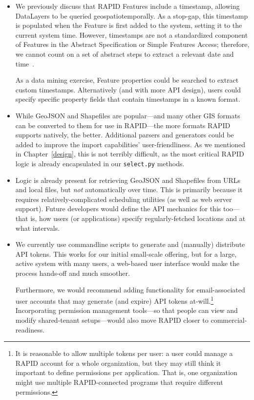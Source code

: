 \begin{itemize}

    \item We previously discuss that RAPID Features include a timestamp, allowing DataLayers to be queried geospatiotemporally. As a stop-gap, this timestamp is populated when the Feature is first added to the system, setting it to the current system time. However, timestamps are not a standardized component of Features in the Abstract Specification or Simple Features Access; therefore, we cannot count on a set of abstract steps to extract a relevant date and time~\cite{SFA}.
    
    As a data mining exercise, Feature properties could be searched to extract custom timestamps. Alternatively (and with more API design), users could specify specific property fields that contain timestamps in a known format.
    
    \item While GeoJSON and Shapefiles are popular---and many other GIS formats can be converted to them for use in RAPID---the more formats RAPID supports natively, the better. Additional parsers and generators could be added to improve the import capabilities' user-friendliness. As we mentioned in Chapter~\ref{design}, this is not terribly difficult, as the most critical RAPID logic is already encapsulated in our \texttt{select.py} methods.
    
    \item Logic is already present for retrieving GeoJSON and Shapefiles from URLs and local files, but \textit{not} automatically over time. This is primarily because it requires relatively-complicated scheduling utilities (as well as web server support). Future developers would define the API mechanics for this too---that is, how users (or applications) specify regularly-fetched locations and at what intervals.
    
    \item We currently use commandline scripts to generate and (manually) distribute API tokens. This works for our initial small-scale offering, but for a large, active system with many users, a web-based user interface would make the process hands-off and much smoother.
    
    Furthermore, we would recommend adding functionality for email-associated user accounts that may generate (and expire) API tokens at-will.\footnote{It is reasonable to allow multiple tokens per user: a user could manage a RAPID account for a whole organization, but they may still think it important to define permissions per application. That is, one organization might use multiple RAPID-connected programs that require different permissions.} Incorporating permission management tools---so that people can view and modify shared-tenant setups---would also move RAPID closer to commercial-readiness.
    

\end{itemize}
